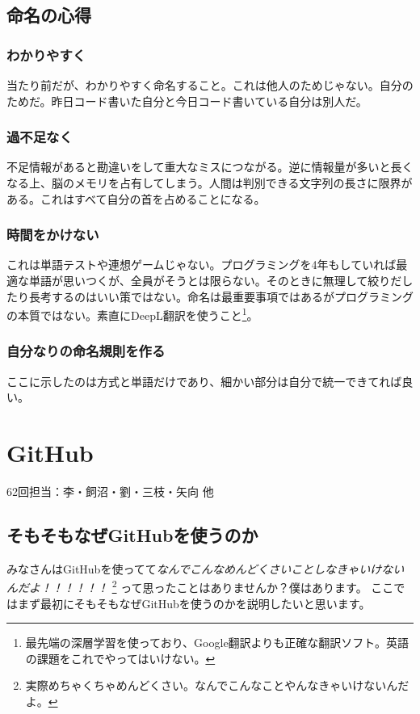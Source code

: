 \documentclass[dvipdfmx,jb5]{jreport}
\begin{document}
\subsection{命名の心得}
\subsubsection{わかりやすく}
当たり前だが、わかりやすく命名すること。これは他人のためじゃない。自分のためだ。昨日コード書いた自分と今日コード書いている自分は別人だ。
\subsubsection{過不足なく}
不足情報があると勘違いをして重大なミスにつながる。逆に情報量が多いと長くなる上、脳のメモリを占有してしまう。人間は判別できる文字列の長さに限界がある。これはすべて自分の首を占めることになる。
\subsubsection{時間をかけない}
これは単語テストや連想ゲームじゃない。プログラミングを4年もしていれば最適な単語が思いつくが、全員がそうとは限らない。そのときに無理して絞りだしたり長考するのはいい策ではない。命名は最重要事項ではあるがプログラミングの本質ではない。素直にDeepL翻訳を使うこと\footnote{最先端の深層学習を使っており、Google翻訳よりも正確な翻訳ソフト。英語の課題をこれでやってはいけない。}。
\subsubsection{自分なりの命名規則を作る}
ここに示したのは方式と単語だけであり、細かい部分は自分で統一できてれば良い。
\section{GitHub}
62回担当：李・飼沼・劉・三枝・矢向 他
\subsection{そもそもなぜGitHubを使うのか}
みなさんはGitHubを使ってて\emph{なんでこんなめんどくさいことしなきゃいけないんだよ！！！！！！}
\footnote{実際めちゃくちゃめんどくさい。なんでこんなことやんなきゃいけないんだよ。}
って思ったことはありませんか？僕はあります。
ここではまず最初にそもそもなぜGitHubを使うのかを説明したいと思います。
\end{document}
